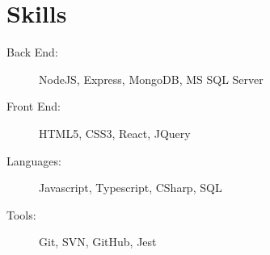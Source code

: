 \documentclass[a4paper,10pt]{article}
\begin{document}

\fancyhead[C]{
}




\section{Skills}

\begin{description}
    \item[Back End:] NodeJS, Express, MongoDB, MS SQL Server
    \item[Front End:] HTML5, CSS3, React, JQuery
    \item[Languages:] Javascript, Typescript, CSharp, SQL
    \item[Tools:] Git, SVN, GitHub, Jest
\end{description}
\end{document}
